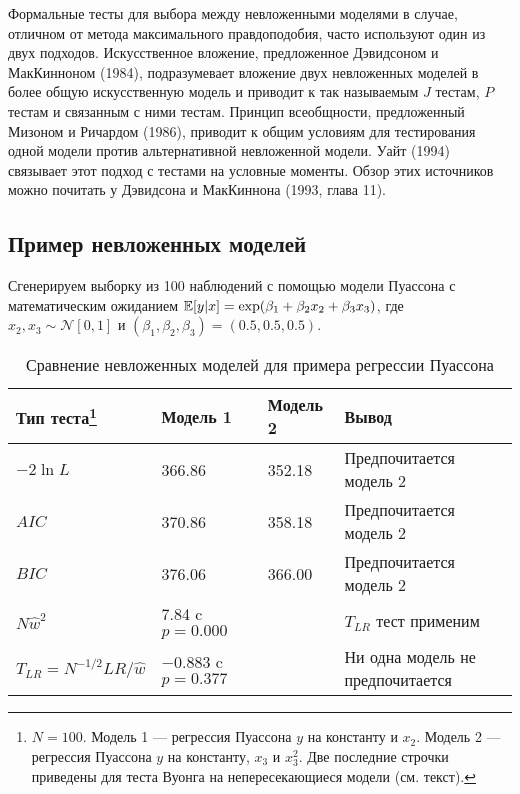 Формальные тесты для выбора между невложенными моделями в случае, отличном от метода максимального правдоподобия, часто используют один из двух подходов. Искусственное вложение, предложенное Дэвидсоном и МакКинноном (1984), подразумевает вложение двух невложенных моделей в более общую искусственную модель и приводит к так называемым $J$ тестам, $P$ тестам и связанным с ними тестам. Принцип всеобщности, предложенный Мизоном и Ричардом (1986), приводит к общим условиям для тестирования одной модели против альтернативной невложенной модели. Уайт (1994) связывает этот подход с тестами на условные моменты. Обзор этих  источников можно почитать у Дэвидсона и МакКиннона (1993, глава 11).

\subsection{Пример невложенных моделей}

Сгенерируем выборку из 100 наблюдений с помощью модели Пуассона с математическим ожиданием $\mathbb{E}[y|x] = \exp(\beta_1 + \beta_2x_2 + \beta_3x_3)$, где $x_2, x_3 \sim \mathcal{N}[0,1]$ и $(\beta_1, \beta_2, \beta_3) = (0.5, 0.5, 0.5).$

\begin{table}[h]
\begin{center}
\caption{\label{tab:nonnestpoiss} Сравнение невложенных моделей для примера регрессии Пуассона}
\begin{minipage}{17cm}
\begin{tabular}[t]{llll}
\hline
\hline
\bf{Тип теста}\footnote{$N = 100$. Модель 1 --- регрессия Пуассона $y$ на константу и $x_2$. Модель 2 --- регрессия Пуассона $y$ на константу, $x_3$ и $x_3^2$. Две последние строчки приведены для теста Вуонга на непересекающиеся модели (см. текст).} & \bf{Модель 1} & \bf{Модель 2} & \bf{Вывод} \\
\hline
$-2\ln L$ & 366.86 & 352.18 & Предпочитается модель 2 \\
$AIC$ & 370.86 & 358.18 & Предпочитается модель 2 \\
$BIC$ & 376.06 & 366.00 & Предпочитается модель 2 \\
$N\hat{w}^2$ & 7.84 c $p = 0.000$ &  & $T_{LR}$ тест применим \\
$T_{LR} = N^{-1/2}LR/\hat{w}$ & $-0.883$ c $p = 0.377$ &  & Ни одна модель не предпочитается \\
\hline
\hline
\end{tabular}
\end{minipage}
\end{center}
\end{table}

